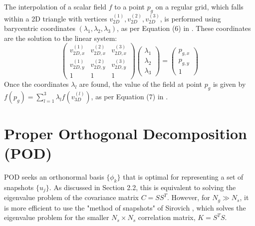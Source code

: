 \documentclass[dscexam, EN]{ufabcFHZh}
\begin{document}
The interpolation of a scalar field $f$ to a point $p_g$ on a regular grid, which falls within a 2D triangle with vertices $v_{2D}^{(1)}, v_{2D}^{(2)}, v_{2D}^{(3)}$, is performed using barycentric coordinates $(\lambda_1, \lambda_2, \lambda_3)$, as per Equation (6) in \cite{[1]}. These coordinates are the solution to the linear system:
\begin{equation}
\begin{pmatrix} v_{2D,x}^{(1)} & v_{2D,x}^{(2)} & v_{2D,x}^{(3)} \\ v_{2D,y}^{(1)} & v_{2D,y}^{(2)} & v_{2D,y}^{(3)} \\ 1 & 1 & 1 \end{pmatrix} \begin{pmatrix} \lambda_1 \\ \lambda_2 \\ \lambda_3 \end{pmatrix} = \begin{pmatrix} p_{g,x} \\ p_{g,y} \\ 1 \end{pmatrix}
\end{equation}
Once the coordinates $\lambda_l$ are found, the value of the field at point $p_g$ is given by $f(p_g) = \sum_{l=1}^{3} \lambda_l f(v_{3D}^{(l)})$, as per Equation (7) in \cite{[1]}.

\section{Proper Orthogonal Decomposition (POD)}
\label{sec:pod_derivation}

POD seeks an orthonormal basis $\{\phi_k\}$ that is optimal for representing a set of snapshots $\{u_j\}$. As discussed in Section 2.2, this is equivalent to solving the eigenvalue problem of the covariance matrix $C = SS^T$. However, for $N_g \gg N_s$, it is more efficient to use the "method of snapshots" of Sirovich \cite{[1]}, which solves the eigenvalue problem for the smaller $N_s \times N_s$ correlation matrix, $K = S^T S$.
\end{document}
